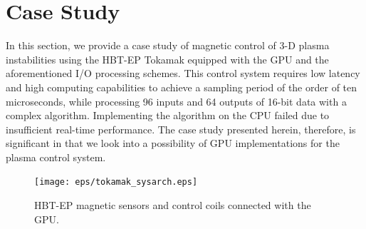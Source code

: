 \section{Case Study}
\label{sec:case_study}

In this section, we provide a case study of magnetic control of
3-D plasma instabilities using the HBT-EP Tokamak equipped with
the GPU and the aforementioned I/O processing schemes.
This control system requires low latency and high computing capabilities
to achieve a sampling period of the order of ten microseconds, while
processing 96 inputs and 64 outputs of 16-bit data with a complex
algorithm.
Implementing the algorithm on the CPU failed due to insufficient real-time
performance. The case study presented herein, therefore, is significant in that we look
into a possibility of GPU implementations for the plasma control system.

\begin{figure}[t]
 \centering
 \texttt{[image: eps/tokamak\_sysarch.eps]}
 \caption{HBT-EP magnetic sensors and control coils connected with the
 GPU.}
 \label{fig:tokamak_sysarch}
\end{figure}

